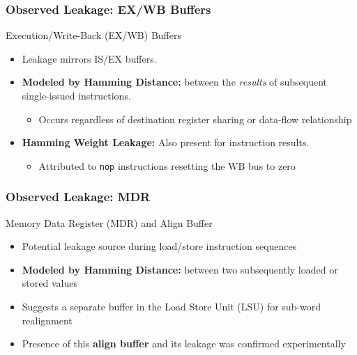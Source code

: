 \begin{frame}
    \frametitle{Observed Leakage: EX/WB Buffers}
    \begin{block}{Execution/Write-Back (EX/WB) Buffers}
        \begin{itemize}
            \item Leakage mirrors IS/EX buffers.
            \item \textbf{Modeled by Hamming Distance:} between the \textit{results} of subsequent single-issued instructions.
                \begin{itemize}
                    \item Occurs regardless of destination register sharing or data-flow relationship
                \end{itemize}
            \item \textbf{Hamming Weight Leakage:} Also present for instruction results.
                \begin{itemize}
                    \item Attributed to \texttt{nop} instructions resetting the WB bus to zero 
                \end{itemize}
        \end{itemize}
    \end{block}
\end{frame}




\begin{frame}
    \frametitle{Observed Leakage: MDR}
    \begin{block}{Memory Data Register (MDR) and Align Buffer}
        \begin{itemize}
            \item Potential leakage source during load/store instruction sequences
            \item \textbf{Modeled by Hamming Distance:} between two subsequently loaded or stored values
            \item Suggests a separate buffer in the Load Store Unit (LSU) for sub-word realignment
            \item Presence of this \textbf{align buffer} and its leakage was confirmed experimentally
        \end{itemize}
    \end{block}
\end{frame}


